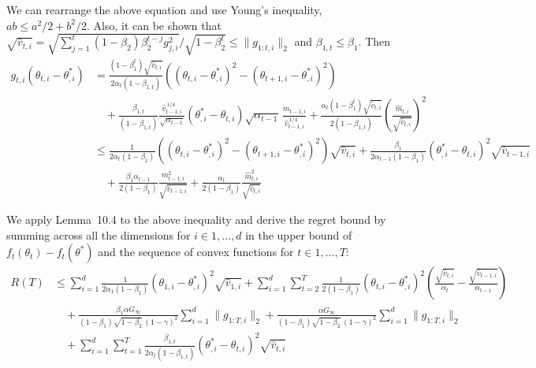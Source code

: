 \documentclass[11pt]{article}
\begin{document}
\noindent
We can rearrange the above equation and use Young's inequality,
$ab \leq a^2/2 + b^2/2$. Also, it can be shown that
$\sqrt{\widehat{v}_{t,i}} = \sqrt{\sum_{j=1}^{t}(1-\beta_2)\beta_2^{t-j} g_{j,i}^2} / \sqrt{1 - \beta_2^t}
 \leq \|g_{1:t,i}\|_2$
and $\beta_{1,t} \leq \beta_1$. Then
\begin{align*}
g_{t,i}(\theta_{t,i} - \theta^*_{,i})
 &= \frac{(1 - \beta_1^t)\sqrt{\widehat{v}_{t,i}}}{2\alpha_t(1 - \beta_{1,t})}
    \left((\theta_{t,i} - \theta^*_{,i})^2 - (\theta_{t+1,i} - \theta^*_{,i})^2\right) \\
 &\quad + \frac{\beta_{1,t}}{(1 - \beta_{1,t})}
          \frac{\widehat{v}_{t-1,i}^{\,1/4}}{\sqrt{\alpha_{t-1}}}
          (\theta^*_{,i} - \theta_{t,i})
          \sqrt{\alpha_{t-1}}\,\frac{m_{t-1,i}}{\widehat{v}_{t-1,i}^{\,1/4}}
          + \frac{\alpha_t(1 - \beta_1^t)\sqrt{\widehat{v}_{t,i}}}{2(1 - \beta_{1,t})}
            \left(\frac{\widehat{m}_{t,i}}{\sqrt{\widehat{v}_{t,i}}}\right)^{\!2} \\
 &\leq \frac{1}{2\alpha_t(1 - \beta_1)}
       \left((\theta_{t,i} - \theta^*_{,i})^2 - (\theta_{t+1,i} - \theta^*_{,i})^2\right)\sqrt{\widehat{v}_{t,i}}
     + \frac{\beta_1}{2\alpha_{t-1}(1 - \beta_1)}(\theta^*_{,i} - \theta_{t,i})^2\sqrt{\widehat{v}_{t-1,i}} \\
 &\quad + \frac{\beta_1\alpha_{t-1}}{2(1 - \beta_1)}
          \frac{m_{t-1,i}^2}{\sqrt{\widehat{v}_{t-1,i}}}
        + \frac{\alpha_t}{2(1 - \beta_1)}
          \frac{\widehat{m}_{t,i}^2}{\sqrt{\widehat{v}_{t,i}}}
\end{align*}

\noindent
We apply Lemma~10.4 to the above inequality and derive the regret
bound by summing across all the dimensions for $i \in 1, \ldots, d$
in the upper bound of $f_t(\theta_t) - f_t(\theta^*)$ and the
sequence of convex functions for $t \in 1, \ldots, T$:
\begin{align*}
R(T)
 &\leq \sum_{i=1}^{d} \frac{1}{2\alpha_1(1 - \beta_1)}
       (\theta_{1,i} - \theta^*_{,i})^2 \sqrt{\widehat{v}_{1,i}}
     + \sum_{i=1}^{d} \sum_{t=2}^{T} \frac{1}{2(1 - \beta_1)}
       (\theta_{t,i} - \theta^*_{,i})^2
       \left(\frac{\sqrt{\widehat{v}_{t,i}}}{\alpha_t} - \frac{\sqrt{\widehat{v}_{t-1,i}}}{\alpha_{t-1}}\right) \\
 &\quad + \frac{\beta_1 \alpha G_\infty}{(1 - \beta_1)\sqrt{1 - \beta_2}\,(1 - \gamma)^2}
          \sum_{i=1}^{d} \|g_{1:T,i}\|_2
        + \frac{\alpha G_\infty}{(1 - \beta_1)\sqrt{1 - \beta_2}\,(1 - \gamma)^2}
          \sum_{i=1}^{d} \|g_{1:T,i}\|_2 \\
 &\quad + \sum_{i=1}^{d} \sum_{t=1}^{T} \frac{\beta_{1,t}}{2\alpha_t(1 - \beta_{1,t})}
          (\theta^*_{,i} - \theta_{t,i})^2 \sqrt{\widehat{v}_{t,i}}
\end{align*}

\end{document}
